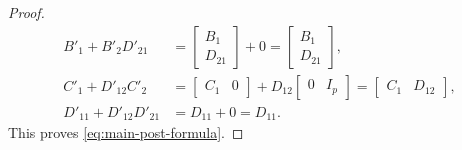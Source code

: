 \documentclass[11pt,a4paper]{article}
\theoremstyle{plain}
\theoremstyle{definition}
\theoremstyle{remark}
\begin{document}
\begin{proof}
\begin{align*}
        B'_1 + B'_2 D'_{21}
         & = \begin{bmatrix} B_1 \\ D_{21} \end{bmatrix} + 0
        = \begin{bmatrix} B_1 \\ D_{21} \end{bmatrix}, \\
        C'_1 + D'_{12} C'_2
         & = \begin{bmatrix} C_1 & 0 \end{bmatrix} + D_{12} \begin{bmatrix} 0 & I_p \end{bmatrix}
        = \begin{bmatrix} C_1 & D_{12} \end{bmatrix}, \\
        D'_{11} + D'_{12} D'_{21}
         & = D_{11} + 0 = D_{11} .
    \end{align*}
    This proves \cref{eq:main-post-formula}.


\end{proof}
\end{document}
